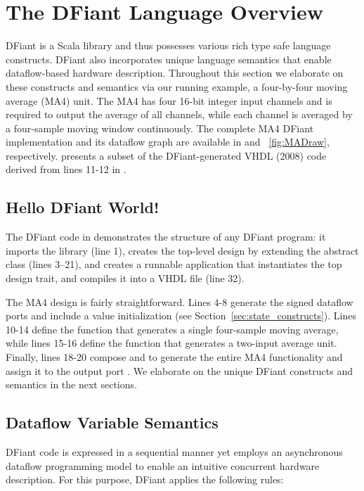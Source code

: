 \section{The DFiant Language Overview}
\label{sec:dfiant}
DFiant is a Scala library and thus possesses various rich type safe language constructs. DFiant also incorporates unique language semantics that enable dataflow-based hardware description. Throughout this section we elaborate on these constructs and semantics via our running example, a four-by-four moving average (MA4) unit. The MA4 has four 16-bit integer input channels and is required to output the average of all channels, while each channel is averaged by a four-sample moving window continuously. The complete MA4 DFiant implementation and its dataflow graph are available in  and ~\ref{fig:MADraw}, respectively.  presents a subset of the DFiant-generated VHDL (2008) code derived from lines 11-12 in .


\subsection{Hello DFiant World!}
The DFiant code in  demonstrates the structure of any DFiant program: it imports the  library (line 1), creates the top-level design by extending the  abstract class (lines 3--21), and creates a runnable application that instantiates the top design trait, and compiles it into a VHDL file (line 32).

The MA4 design is fairly straightforward. Lines 4-8 generate the signed dataflow ports and include a  value initialization (see Section~\ref{sec:state_constructs}). 
Lines 10-14 define the function  that generates a single four-sample moving average, while lines 15-16 define the function  that generates a two-input average unit. Finally, lines 18-20 compose  and  to generate the entire MA4 functionality and assign it to the output port . We elaborate on the unique DFiant constructs and semantics in the next sections.


\subsection{Dataflow Variable Semantics}
DFiant code is expressed in a sequential manner yet employs an asynchronous dataflow programming model to enable an intuitive concurrent hardware description. For this purpose, DFiant applies the following rules:

